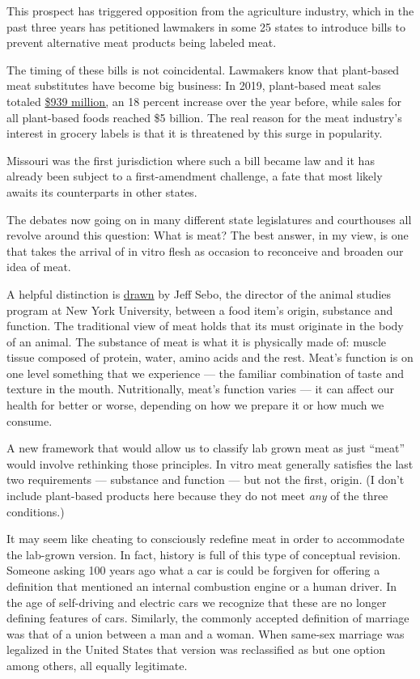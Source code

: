 This prospect has triggered opposition from the agriculture industry,
which in the past three years has petitioned lawmakers in some 25 states
to introduce bills to prevent alternative meat products being labeled
meat.

The timing of these bills is not coincidental. Lawmakers know that
plant-based meat substitutes have become big business: In 2019,
plant-based meat sales totaled
\href{https://www.gfi.org/blog-state-of-the-industry-2020\#:~:text=SPINS\%20data\%20compiled\%20by\%20GFI,has\%20greatly\%20outstripped\%20conventional\%20meat.}{\$939
million,} an 18 percent increase over the year before, while sales for
all plant-based foods reached \$5 billion. The real reason for the meat
industry's interest in grocery labels is that it is threatened by this
surge in popularity.

Missouri was the first jurisdiction where such a bill became law and it
has already been subject to a first-amendment challenge, a fate that
most likely awaits its counterparts in other states.

The debates now going on in many different state legislatures and
courthouses all revolve around this question: What is meat? The best
answer, in my view, is one that takes the arrival of in vitro flesh as
occasion to reconceive and broaden our idea of meat.

A helpful distinction is
\href{https://www.erudit.org/en/journals/ateliers/2018-v13-n1-ateliers04192/1055123ar/}{drawn}
by Jeff Sebo, the director of the animal studies program at New York
University, between a food item's origin, substance and function. The
traditional view of meat holds that its must originate in the body of an
animal. The substance of meat is what it is physically made of: muscle
tissue composed of protein, water, amino acids and the rest. Meat's
function is on one level something that we experience --- the familiar
combination of taste and texture in the mouth. Nutritionally, meat's
function varies --- it can affect our health for better or worse,
depending on how we prepare it or how much we consume.

A new framework that would allow us to classify lab grown meat as just
``meat'' would involve rethinking those principles. In vitro meat
generally satisfies the last two requirements --- substance and function
--- but not the first, origin. (I don't include plant-based products
here because they do not meet \emph{any} of the three conditions.)

It may seem like cheating to consciously redefine meat in order to
accommodate the lab-grown version. In fact, history is full of this type
of conceptual revision. Someone asking 100 years ago what a car is could
be forgiven for offering a definition that mentioned an internal
combustion engine or a human driver. In the age of self-driving and
electric cars we recognize that these are no longer defining features of
cars. Similarly, the commonly accepted definition of marriage was that
of a union between a man and a woman. When same-sex marriage was
legalized in the United States that version was reclassified as but one
option among others, all equally legitimate.

